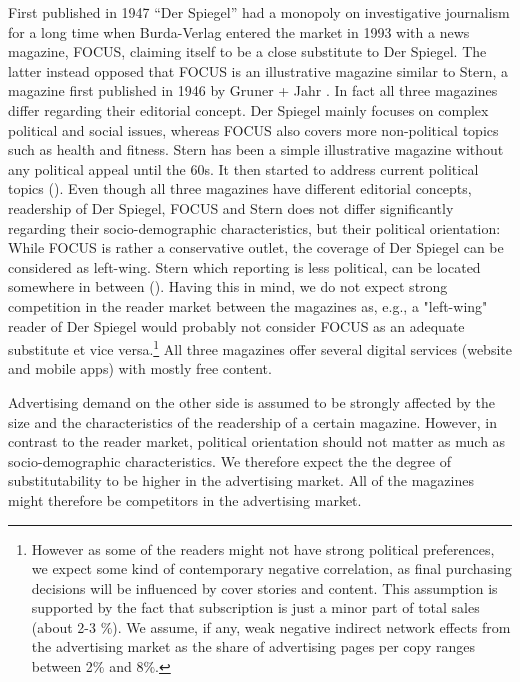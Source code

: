 \documentclass[12pt,a4paper]{scrreprt}
\begin{document}
First published in 1947 ``Der Spiegel'' had a monopoly on investigative journalism for a long time when Burda-Verlag entered the market in 1993 with a news magazine, FOCUS, claiming itself to be a close substitute to Der Spiegel. The latter instead opposed that FOCUS is an illustrative magazine similar to Stern, a magazine first published in 1946 by Gruner + Jahr \cite{kaltenhaeuser_abstimmung_2005}. In fact all three magazines differ regarding their editorial concept. Der Spiegel mainly focuses on complex political and social issues, whereas FOCUS also covers more non-political topics such as health and fitness. Stern has been a simple illustrative magazine without any political appeal until the 60s. It then started to address current political topics (\cite{vogel_populaere_1998}). Even though all three magazines have different editorial concepts, readership of Der Spiegel, FOCUS and Stern does not differ significantly regarding their socio-demographic characteristics, but their political orientation: While FOCUS is rather a conservative outlet, the coverage of Der Spiegel can be considered as left-wing. Stern which reporting is less political, can be located somewhere in between (\cite{kaltenhaeuser_abstimmung_2005}). Having this in mind, we do not expect strong competition in the reader market between the magazines as, e.g., a "left-wing" reader of Der Spiegel would probably not consider FOCUS as an adequate substitute et vice versa.\footnote{However as some of the readers might not have strong political preferences, we expect some kind of contemporary negative correlation, as final purchasing decisions will be influenced by cover stories and content. This assumption is supported by the fact that subscription is just a minor part of total sales (about 2-3 $\%$). We assume, if any, weak negative indirect network effects from the advertising market as the share of advertising pages per copy ranges between 2$\%$ and 8$\%$.} All three magazines offer several digital services (website and mobile apps) with mostly free content. 

Advertising demand on the other side is assumed to be strongly affected by the size and the characteristics of the readership of a certain magazine. However, in contrast to the reader market, political orientation should not matter as much as socio-demographic characteristics. We therefore expect the the degree of substitutability to be higher in the advertising market. All of the magazines might therefore be competitors in the advertising market.  
\end{document}
